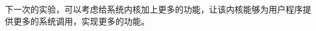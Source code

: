 \documentclass[forprint]{WHUBachelor}
\begin{document}
下一次的实验，可以考虑给系统内核加上更多的功能，让该内核能够为用户程序提供更多的系统调用，实现更多的功能。







% 










\appendix
\end{document}
